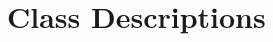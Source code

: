 \begin{comment}

\parhead{XP} This column on \trefnum{Base Save and Base Attack Bonuses} shows the experience point total
needed to attain a given character level -- that is, the total of all the
character's level in classes. (A character's level in a particular class is called his
or her class level.) For any character (including a multiclass one), XP
determines overall character level, not individual class levels.

\parhead{Feats} Every character gains one feat at 1st level and another at
every level divisible by three (3rd, 6th, 9th, 12th, 15th, and 18th
level). These feats are in addition to any bonus feats granted as class
features (see the class descriptions later in this chapter) and the
bonus feat granted to all humans. See Chapter 5: Feats for more
information about feats.

\parhead{Ability Increases} Upon attaining any level divisible by four
(4th, 8th, 12th, 16th, and 20th level), a character increases one of his
or her attribute scores by 1 point. The player chooses which ability
score to improve.
\begin{cp}%
For example, a sorcerer with a starting Charisma of
16 might increase this to 17 at 4th level. At 8th level, the same
character might increase his Charisma score again (from 17 to 18) or
could choose to improve some other ability instead.
\end{cp}
The ability improvement is permanent.

For multiclass characters, feats and attribute score increases are
gained according to character level, not class level.
\begin{cp}%
Thus, a 3rd-level wizard/1st-level fighter is a 4th-level character overall and eligible
for her first attribute score boost.
\end{cp}
\end{comment}
%
\section{Class Descriptions}

